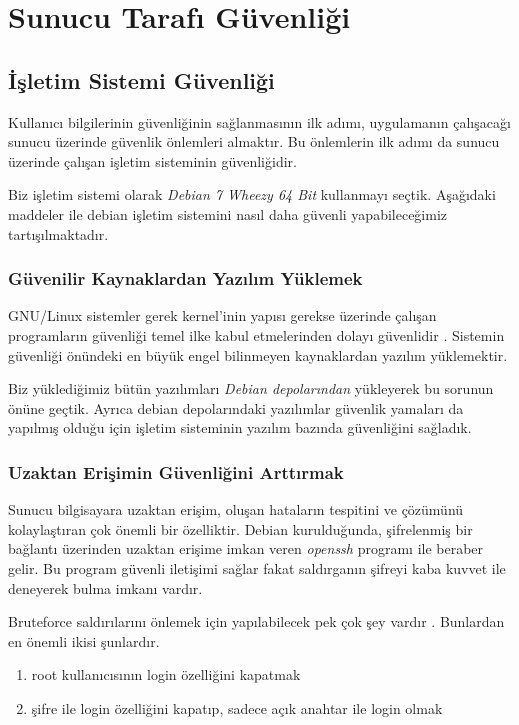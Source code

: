 \documentclass[11pt]{report}
\begin{document}
\chapter{Sunucu Tarafı Güvenliği}

\section{İşletim Sistemi Güvenliği}

Kullanıcı bilgilerinin güvenliğinin sağlanmasının ilk adımı, uygulamanın çalışacağı sunucu üzerinde güvenlik önlemleri almaktır. Bu önlemlerin ilk adımı da sunucu üzerinde çalışan işletim sisteminin güvenliğidir.

Biz işletim sistemi olarak \emph{Debian 7 Wheezy 64 Bit} kullanmayı seçtik. Aşağıdaki maddeler ile debian işletim sistemini nasıl daha güvenli yapabileceğimiz tartışılmaktadır.

\subsection{Güvenilir Kaynaklardan Yazılım Yüklemek}

GNU/Linux sistemler gerek kernel'inin yapısı gerekse üzerinde çalışan programların güvenliği temel ilke kabul etmelerinden dolayı güvenlidir \cite{linuxsec}. Sistemin güvenliği önündeki en büyük engel bilinmeyen kaynaklardan yazılım yüklemektir.

Biz yüklediğimiz bütün yazılımları \emph{Debian depolarından} yükleyerek bu sorunun önüne geçtik. Ayrıca debian depolarındaki yazılımlar güvenlik yamaları da yapılmış olduğu için işletim sisteminin yazılım bazında güvenliğini sağladık.

\subsection{Uzaktan Erişimin Güvenliğini Arttırmak}

Sunucu bilgisayara uzaktan erişim, oluşan hataların tespitini ve çözümünü kolaylaştıran çok önemli bir özelliktir. Debian kurulduğunda, şifrelenmiş bir bağlantı üzerinden uzaktan erişime imkan veren \emph{openssh} programı ile beraber gelir. Bu program güvenli iletişimi sağlar fakat saldırganın şifreyi kaba kuvvet ile deneyerek bulma imkanı vardır.

Bruteforce saldırılarını önlemek için yapılabilecek pek çok şey vardır \cite{blog}. Bunlardan en önemli ikisi şunlardır.

\begin{enumerate}
\item root kullanıcısının login özelliğini kapatmak
\item şifre ile login özelliğini kapatıp, sadece açık anahtar ile login olmak
\end{enumerate}
\end{document}
